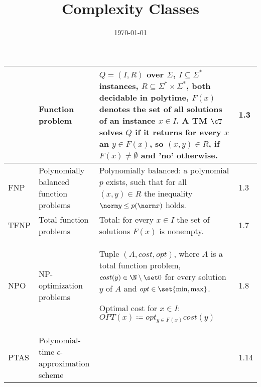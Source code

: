 \documentclass[a4paper, 9pt, landscape]{article}
\title{Complexity Classes}
\date{\today}
\begin{document}
\maketitle

\begin{table}[ht!]
  \centering
  \begin{tabular}[ht!]{l | p{7cm}| p{14cm}| l}
    & Function problem & $Q = (I, R)$ over $\Sigma$, $I \subseteq \Sigma^*$ instances, $R \subseteq \Sigma^* \times \Sigma^*$, both decidable in polytime, $F(x)$ denotes the set of all solutions of an instance $x \in I$. A TM $\cT$ solves $Q$ if it returns for every $x$ an $y \in F(x)$, so $(x, y) \in R$, if $F(x) \neq \emptyset$ and 'no' otherwise. & 1.3 \\ \hline
    FNP &Polynomially balanced function problems & Polynomially balanced: a polynomial $p$ exists, such that for all $(x, y) \in R$ the inequality $\norm y \leq p(\norm x)$ holds.  & 1.3\\ \hline
    TFNP& Total function problems & Total: for every $x \in I$ the set of solutions $F(x)$ is nonempty. & 1.7\\ \hline
    NPO & NP-optimization problems& Tuple $(A, cost, opt)$, where $A$ is a total function problem, $cost(y) \in \N\setminus\set 0$ for every solution $y$ of $A$ and $opt \in \set{\min, \max}$.

                                                                                                                                                                                                                                                                                                                                                                Optimal cost for $x \in I$: $OPT(x) \coloneqq opt_{y \in F(x)}cost(y)$ & 1.8\\ \hline
          PTAS & Polynomial-time $\epsilon$-approximation scheme && 1.14\\ \hline
    

\end{tabular}
\end{table}
\end{document}
